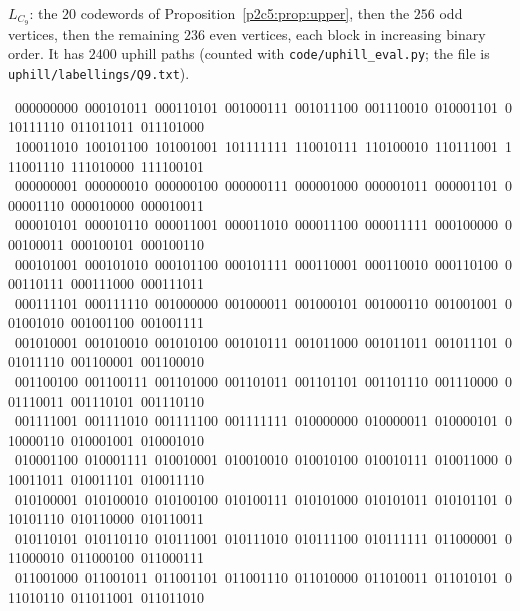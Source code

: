 $L_{C_9}$: the $20$ codewords of Proposition~\ref{p2c5:prop:upper}, then the $256$ odd vertices,
then the remaining $236$ even vertices, each block in increasing binary order. It has $2400$
uphill paths (counted with \texttt{code/uphill\_eval.py}; the file is
\texttt{uphill/labellings/Q9.txt}).
\begin{flushleft}\scriptsize\ttfamily
{}\ 000000000\ 000101011\ 000110101\ 001000111\ 001011100\ 001110010\ 010001101\ 010111110\ 011011011\ 011101000\\
\ 100011010\ 100101100\ 101001001\ 101111111\ 110010111\ 110100010\ 110111001\ 111001110\ 111010000\ 111100101\\
\ 000000001\ 000000010\ 000000100\ 000000111\ 000001000\ 000001011\ 000001101\ 000001110\ 000010000\ 000010011\\
\ 000010101\ 000010110\ 000011001\ 000011010\ 000011100\ 000011111\ 000100000\ 000100011\ 000100101\ 000100110\\
\ 000101001\ 000101010\ 000101100\ 000101111\ 000110001\ 000110010\ 000110100\ 000110111\ 000111000\ 000111011\\
\ 000111101\ 000111110\ 001000000\ 001000011\ 001000101\ 001000110\ 001001001\ 001001010\ 001001100\ 001001111\\
\ 001010001\ 001010010\ 001010100\ 001010111\ 001011000\ 001011011\ 001011101\ 001011110\ 001100001\ 001100010\\
\ 001100100\ 001100111\ 001101000\ 001101011\ 001101101\ 001101110\ 001110000\ 001110011\ 001110101\ 001110110\\
\ 001111001\ 001111010\ 001111100\ 001111111\ 010000000\ 010000011\ 010000101\ 010000110\ 010001001\ 010001010\\
\ 010001100\ 010001111\ 010010001\ 010010010\ 010010100\ 010010111\ 010011000\ 010011011\ 010011101\ 010011110\\
\ 010100001\ 010100010\ 010100100\ 010100111\ 010101000\ 010101011\ 010101101\ 010101110\ 010110000\ 010110011\\
\ 010110101\ 010110110\ 010111001\ 010111010\ 010111100\ 010111111\ 011000001\ 011000010\ 011000100\ 011000111\\
\ 011001000\ 011001011\ 011001101\ 011001110\ 011010000\ 011010011\ 011010101\ 011010110\ 011011001\ 011011010\\

\end{flushleft}
